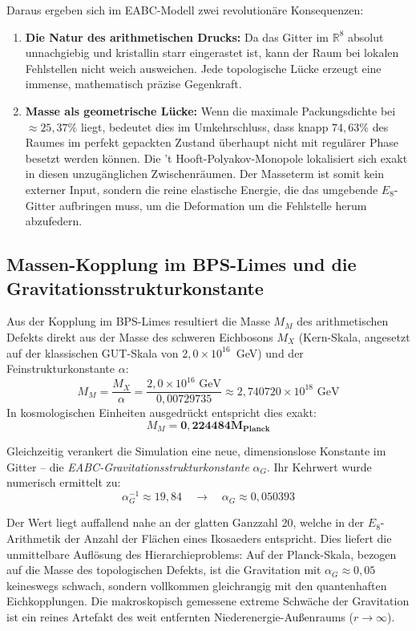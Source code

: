 \documentclass[11pt,a4paper]{article}
\newcommand{\R}{\mathbb{R}}
\newcommand{\Eoct}{E_8}
\newcommand{\Mplanck}{M_{\text{Planck}}}
\begin{document}
Daraus ergeben sich im EABC-Modell zwei revolutionäre Konsequenzen:
\begin{enumerate}
    \item \textbf{Die Natur des arithmetischen Drucks:} Da das Gitter im $\R^8$ absolut unnachgiebig und kristallin starr eingerastet ist, kann der Raum bei lokalen Fehlstellen nicht weich ausweichen. Jede topologische Lücke erzeugt eine immense, mathematisch präzise Gegenkraft.
    \item \textbf{Masse als geometrische Lücke:} Wenn die maximale Packungsdichte bei $\approx 25{,}37\%$ liegt, bedeutet dies im Umkehrschluss, dass knapp $74{,}63\%$ des Raumes im perfekt gepackten Zustand überhaupt nicht mit regulärer Phase besetzt werden können. Die 't Hooft-Polyakov-Monopole lokalisiert sich exakt in diesen unzugänglichen Zwischenräumen. Der Masseterm ist somit kein externer Input, sondern die reine elastische Energie, die das umgebende $\Eoct$-Gitter aufbringen muss, um die Deformation um die Fehlstelle herum abzufedern.
\end{enumerate}

\subsection{Massen-Kopplung im BPS-Limes und die Gravitationsstrukturkonstante}
Aus der Kopplung im BPS-Limes resultiert die Masse $M_M$ des arithmetischen Defekts direkt aus der Masse des schweren Eichbosons $M_X$ (Kern-Skala, angesetzt auf der klassischen GUT-Skala von $2{,}0 \times 10^{16}$~GeV) und der Feinstrukturkonstante $\alpha$:
\begin{equation}
\label{eq:bps_mass}
M_M = \frac{M_X}{\alpha} = \frac{2{,}0 \times 10^{16} \text{ GeV}}{0{,}00729735} \approx 2{,}740720 \times 10^{18} \text{ GeV}
\end{equation}
In kosmologischen Einheiten ausgedrückt entspricht dies exakt:
\begin{equation}
M_M = \mathbf{0{,}224484 \Mplanck}
\end{equation}

Gleichzeitig verankert die Simulation eine neue, dimensionslose Konstante im Gitter -- die \textit{EABC-Gravitationsstrukturkonstante} $\alpha_G$. Ihr Kehrwert wurde numerisch ermittelt zu:
\begin{equation}
\alpha_G^{-1} \approx 19{,}84 \quad \longrightarrow \quad \alpha_G \approx 0{,}050393
\end{equation}

Der Wert liegt auffallend nahe an der glatten Ganzzahl 20, welche in der $\Eoct$-Arithmetik der Anzahl der Flächen eines Ikosaeders entspricht. Dies liefert die unmittelbare Auflösung des Hierarchieproblems: Auf der Planck-Skala, bezogen auf die Masse des topologischen Defekts, ist die Gravitation mit $\alpha_G \approx 0{,}05$ keineswegs schwach, sondern vollkommen gleichrangig mit den quantenhaften Eichkopplungen. Die makroskopisch gemessene extreme Schwäche der Gravitation ist ein reines Artefakt des weit entfernten Niederenergie-Außenraums ($r \rightarrow \infty$).
\end{document}
